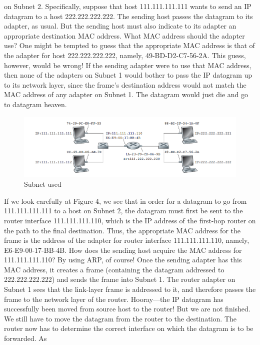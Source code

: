 \documentclass{article}
\begin{document}
\begin{description}
    on Subnet 2. Specifically, suppose that host 111.111.111.111 wants to send an IP
    datagram to a host 222.222.222.222. The sending host passes the datagram to its
    adapter, as usual. But the sending host must also indicate to its adapter an appropriate
    destination MAC address. What MAC address should the adapter use? One
    might be tempted to guess that the appropriate MAC address is that of the adapter
    for host 222.222.222.222, namely, 49-BD-D2-C7-56-2A. This guess, however,
    would be wrong! If the sending adapter were to use that MAC address, then none
    of the adapters on Subnet 1 would bother to pass the IP datagram up to its network
    layer, since the frame’s destination address would not match the MAC
    address of any adapter on Subnet 1. The datagram would just die and go to datagram
    heaven.
    \begin{figure}[H]
        \centering
        \includegraphics[scale=0.6]{images/arp_2.png}
        \caption{Subnet used}
    \end{figure}
    If we look carefully at Figure 4, we see that in order for a datagram to go
    from 111.111.111.111 to a host on Subnet 2, the datagram must first be sent to the
    router interface 111.111.111.110, which is the IP address of the first-hop router
    on the path to the final destination. Thus, the appropriate MAC address for the
    frame is the address of the adapter for router interface 111.111.111.110, namely,
    E6-E9-00-17-BB-4B. How does the sending host acquire the MAC address for
    111.111.111.110? By using ARP, of course! Once the sending adapter has this
    MAC address, it creates a frame (containing the datagram addressed to
    222.222.222.222) and sends the frame into Subnet 1. The router adapter on Subnet
    1 sees that the link-layer frame is addressed to it, and therefore passes the
    frame to the network layer of the router. Hooray—the IP datagram has successfully
    been moved from source host to the router! But we are not finished. We still
    have to move the datagram from the router to the destination. The router now has
    to determine the correct interface on which the datagram is to be forwarded. As

\end{description}
\end{document}
